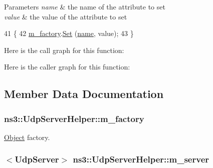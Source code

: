 \begin{DoxyParams}{Parameters}
{\em name} & the name of the attribute to set \\
\hline
{\em value} & the value of the attribute to set \\
\hline
\end{DoxyParams}

\begin{DoxyCode}
41 \{
42   \hyperlink{classns3_1_1UdpServerHelper_a8d052da43e7f2597a6f8fd40cf31c947}{m\_factory}.\hyperlink{classns3_1_1ObjectFactory_aef5c0d5019c96bdf01cefd1ff83f4a68}{Set} (\hyperlink{generate__test__data__lte__spectrum__model_8m_ab74e6bf80237ddc4109968cedc58c151}{name}, value);
43 \}
\end{DoxyCode}


Here is the call graph for this function\+:




Here is the caller graph for this function\+:




\subsection{Member Data Documentation}
\subsubsection[{\texorpdfstring{m\+\_\+factory}{m_factory}}]{ ns3\+::\+Udp\+Server\+Helper\+::m\+\_\+factory\hspace{0.3cm}{\ttfamily [private]}}\hypertarget{classns3_1_1UdpServerHelper_a8d052da43e7f2597a6f8fd40cf31c947}{}\label{classns3_1_1UdpServerHelper_a8d052da43e7f2597a6f8fd40cf31c947}


\hyperlink{classns3_1_1Object}{Object} factory. 

\subsubsection[{\texorpdfstring{m\+\_\+server}{m_server}}]{$<${\bf Udp\+Server}$>$ ns3\+::\+Udp\+Server\+Helper\+::m\+\_\+server\hspace{0.3cm}{\ttfamily [private]}}\hypertarget{classns3_1_1UdpServerHelper_a1594a0e276c11bc263fe9c9367ac5bf3}{}\label{classns3_1_1UdpServerHelper_a1594a0e276c11bc263fe9c9367ac5bf3}


